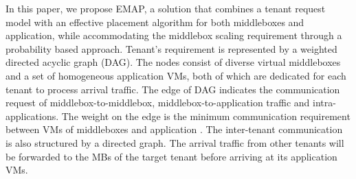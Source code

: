 \documentclass[review]{elsarticle}
\begin{document}
In this paper, we propose EMAP, a solution that combines a tenant request model with an effective placement algorithm for both middleboxes and application, while accommodating the middlebox scaling requirement through a probability based approach.  
Tenant's requirement is represented by a weighted directed acyclic graph (DAG). The nodes consist of diverse virtual middleboxes and a set of homogeneous application VMs, both of which are dedicated for each tenant to process arrival traffic. The edge of DAG indicates the communication request of middlebox-to-middlebox, middlebox-to-application traffic and intra-applications. The weight on the edge is the minimum communication requirement between VMs of middleboxes and application \cite{stratos12, B11tpd}. The inter-tenant communication \cite{B13cta} is also structured by a directed graph. The arrival traffic from other tenants will be forwarded to the MBs of the target tenant before arriving at its application VMs.
\end{document}
